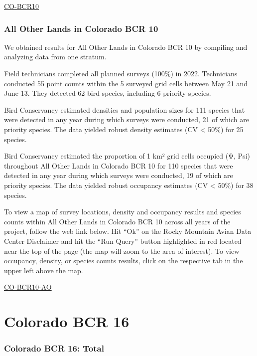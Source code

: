 \documentclass[
  letterpaper,
  DIV=11,
  numbers=noendperiod,
  oneside]{scrreprt}
\begin{document}
\href{http://www.rmbo.org/new_site/adc/QueryWindow.aspx\#N4IgzgrgDgpgTmALnAhoiBbEAuABCAYQHkBaAIQICUBGABhAF8g=}{CO-BCR10}

\hypertarget{all-other-lands-in-colorado-bcr-10}{%
\subsubsection{All Other Lands in Colorado BCR
10}\label{all-other-lands-in-colorado-bcr-10}}

We obtained results for All Other Lands in Colorado BCR 10 by compiling
and analyzing data from one stratum.

Field technicians completed all planned surveys (100\%) in 2022.
Technicians conducted 55 point counts within the 5 surveyed grid cells
between May 21 and June 13. They detected 62 bird species, including 6
priority species.

Bird Conservancy estimated densities and population sizes for 111
species that were detected in any year during which surveys were
conducted, 21 of which are priority species. The data yielded robust
density estimates (CV \textless{} 50\%) for 25 species.

Bird Conservancy estimated the proportion of 1 km² grid cells occupied
(Ψ, Psi) throughout All Other Lands in Colorado BCR 10 for 110 species
that were detected in any year during which surveys were conducted, 19
of which are priority species. The data yielded robust occupancy
estimates (CV \textless{} 50\%) for 38 species.

To view a map of survey locations, density and occupancy results and
species counts within All Other Lands in Colorado BCR 10 across all
years of the project, follow the web link below. Hit ``Ok'' on the Rocky
Mountain Avian Data Center Disclaimer and hit the ``Run Query'' button
highlighted in red located near the top of the page (the map will zoom
to the area of interest). To view occupancy, density, or species counts
results, click on the respective tab in the upper left above the map.

\href{http://www.rmbo.org/new_site/adc/QueryWindow.aspx\#N4IgzgLgTghhCuBbEAuABCAwgeQLQCFMAlARgAZcBBbdSgGzrWwgAsBTKNAGRgDsATMCAC+QA===}{CO-BCR10-AO}

\hypertarget{colorado-bcr-16}{%
\section{Colorado BCR 16}\label{colorado-bcr-16}}

\hypertarget{colorado-bcr-16-total}{%
\subsubsection{Colorado BCR 16: Total}\label{colorado-bcr-16-total}}
\end{document}
